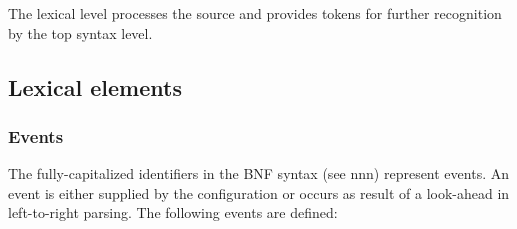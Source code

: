 The lexical level processes the source and provides tokens for further
recognition by the top syntax level.

\hypertarget{lexical-elements}{%
\subsection{Lexical elements}\label{lexical-elements}}

\hypertarget{events}{%
\subsubsection{Events}\label{events}}

The fully-capitalized identifiers in the BNF syntax (see nnn) represent
events. An event is either supplied by the configuration or occurs as
result of a look-ahead in left-to-right parsing. The following events
are defined:

